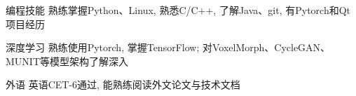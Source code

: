 

\begin{cvskills}

  \cvskill
    {编程技能} %
    {熟练掌握Python、Linux, 熟悉C/C++, 了解Java、git, 有Pytorch和Qt项目经历} %

  \cvskill
  {深度学习} %
  {熟练使用Pytorch, 掌握TensorFlow; 对VoxelMorph、CycleGAN、MUNIT等模型架构了解深入} %


  \cvskill
    {外语} %
    {英语CET-6通过, 能熟练阅读外文论文与技术文档} %

\end{cvskills}
